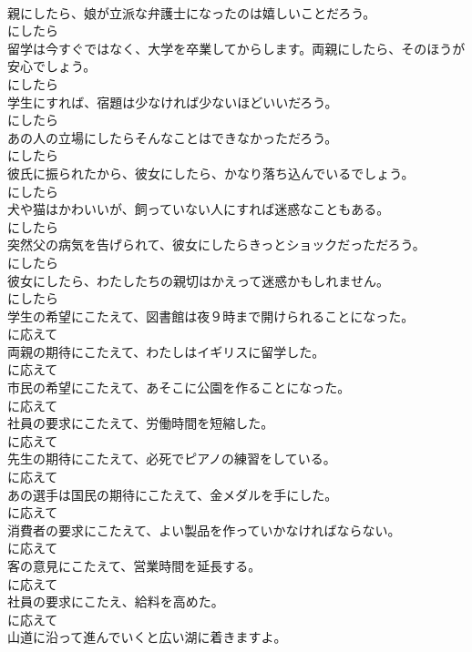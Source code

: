 \documentclass[8pt]{extreport}
\begin{document}
\begin{CJK}{UTF8}{min}
\\	親にしたら、娘が立派な弁護士になったのは嬉しいことだろう。	
\\	にしたら
\\	留学は今すぐではなく、大学を卒業してからします。両親にしたら、そのほうが安心でしょう。	
\\	にしたら
\\	学生にすれば、宿題は少なければ少ないほどいいだろう。	
\\	にしたら
\\	あの人の立場にしたらそんなことはできなかっただろう。	
\\	にしたら
\\	彼氏に振られたから、彼女にしたら、かなり落ち込んでいるでしょう。	
\\	にしたら
\\	犬や猫はかわいいが、飼っていない人にすれば迷惑なこともある。	
\\	にしたら
\\	突然父の病気を告げられて、彼女にしたらきっとショックだっただろう。	
\\	にしたら
\\	彼女にしたら、わたしたちの親切はかえって迷惑かもしれません。	
\\	にしたら
\\	学生の希望にこたえて、図書館は夜９時まで開けられることになった。	
\\	に応えて
\\	両親の期待にこたえて、わたしはイギリスに留学した。	
\\	に応えて
\\	市民の希望にこたえて、あそこに公園を作ることになった。	
\\	に応えて
\\	社員の要求にこたえて、労働時間を短縮した。	
\\	に応えて
\\	先生の期待にこたえて、必死でピアノの練習をしている。	
\\	に応えて
\\	あの選手は国民の期待にこたえて、金メダルを手にした。	
\\	に応えて
\\	消費者の要求にこたえて、よい製品を作っていかなければならない。	
\\	に応えて
\\	客の意見にこたえて、営業時間を延長する。	
\\	に応えて
\\	社員の要求にこたえ、給料を高めた。	
\\	に応えて
\\	山道に沿って進んでいくと広い湖に着きますよ。	

\end{CJK}
\end{document}
